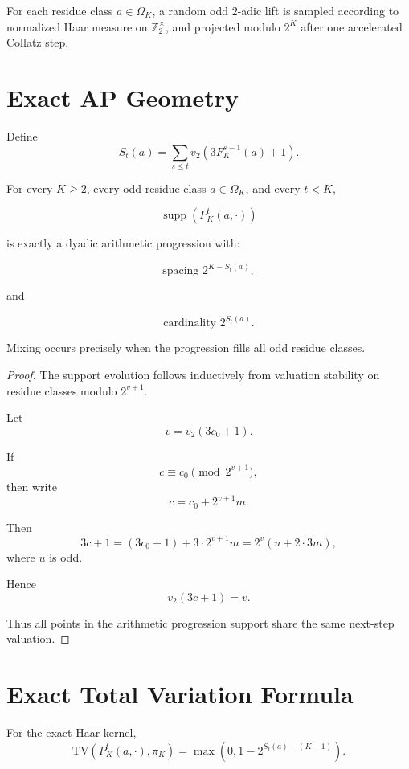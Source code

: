 \documentclass[11pt]{article}
\begin{document}
For each residue class \(a\in\Omega_K\),
a random odd \(2\)-adic lift is sampled according to normalized Haar measure on \(\mathbb Z_2^\times\),
and projected modulo \(2^K\) after one accelerated Collatz step.

\section{Exact AP Geometry}

Define
\[
S_t(a)=\sum_{s\le t} v_2\!\left(3F_K^{s-1}(a)+1\right).
\]

\begin{theorem}
For every \(K\ge2\),
every odd residue class \(a\in\Omega_K\),
and every \(t<K\),

\[
\operatorname{supp}(P_K^t(a,\cdot))
\]

is exactly a dyadic arithmetic progression with:

\[
\text{spacing } 2^{K-S_t(a)},
\]

and

\[
\text{cardinality } 2^{S_t(a)}.
\]

Mixing occurs precisely when the progression fills all odd residue classes.
\end{theorem}

\begin{proof}
The support evolution follows inductively from valuation stability on residue classes modulo \(2^{v+1}\).

Let
\[
v=v_2(3c_0+1).
\]

If
\[
c\equiv c_0 \pmod{2^{v+1}},
\]
then write
\[
c=c_0+2^{v+1}m.
\]

Then
\[
3c+1
=
(3c_0+1)+3\cdot2^{v+1}m
=
2^v(u+2\cdot3m),
\]
where \(u\) is odd.

Hence
\[
v_2(3c+1)=v.
\]

Thus all points in the arithmetic progression support share the same next-step valuation.
\end{proof}

\section{Exact Total Variation Formula}

\begin{theorem}
For the exact Haar kernel,
\[
\mathrm{TV}(P_K^t(a,\cdot),\pi_K)
=
\max\left(0,1-2^{S_t(a)-(K-1)}\right).
\]
\end{theorem}
\end{document}
